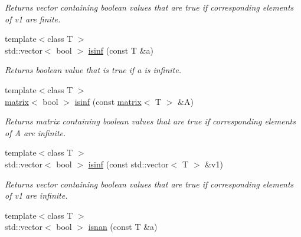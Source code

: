 \begin{DoxyCompactItemize}
\begin{DoxyCompactList}\small\item\em Returns vector containing boolean values that are true if corresponding elements of v1 are finite. \end{DoxyCompactList}\item 
\hypertarget{namespacekeycpp_adca45e7f46618cf193b6b7bb59465a9d}{{\footnotesize template$<$class T $>$ }\\std\-::vector$<$ bool $>$ \hyperlink{namespacekeycpp_adca45e7f46618cf193b6b7bb59465a9d}{isinf} (const T \&a)}\label{namespacekeycpp_adca45e7f46618cf193b6b7bb59465a9d}

\begin{DoxyCompactList}\small\item\em Returns boolean value that is true if a is infinite. \end{DoxyCompactList}\item 
\hypertarget{namespacekeycpp_abf12e8a9c04720e074328bb1d34dce04}{{\footnotesize template$<$class T $>$ }\\\hyperlink{classkeycpp_1_1matrix}{matrix}$<$ bool $>$ \hyperlink{namespacekeycpp_abf12e8a9c04720e074328bb1d34dce04}{isinf} (const \hyperlink{classkeycpp_1_1matrix}{matrix}$<$ T $>$ \&A)}\label{namespacekeycpp_abf12e8a9c04720e074328bb1d34dce04}

\begin{DoxyCompactList}\small\item\em Returns matrix containing boolean values that are true if corresponding elements of A are infinite. \end{DoxyCompactList}\item 
\hypertarget{namespacekeycpp_a34d8480a27e0e6d14d687054a221c0a5}{{\footnotesize template$<$class T $>$ }\\std\-::vector$<$ bool $>$ \hyperlink{namespacekeycpp_a34d8480a27e0e6d14d687054a221c0a5}{isinf} (const std\-::vector$<$ T $>$ \&v1)}\label{namespacekeycpp_a34d8480a27e0e6d14d687054a221c0a5}

\begin{DoxyCompactList}\small\item\em Returns vector containing boolean values that are true if corresponding elements of v1 are infinite. \end{DoxyCompactList}\item 
\hypertarget{namespacekeycpp_a6b5311cd26b6819f68c158d08c39d501}{{\footnotesize template$<$class T $>$ }\\std\-::vector$<$ bool $>$ \hyperlink{namespacekeycpp_a6b5311cd26b6819f68c158d08c39d501}{isnan} (const T \&a)}\label{namespacekeycpp_a6b5311cd26b6819f68c158d08c39d501}


\end{DoxyCompactItemize}
